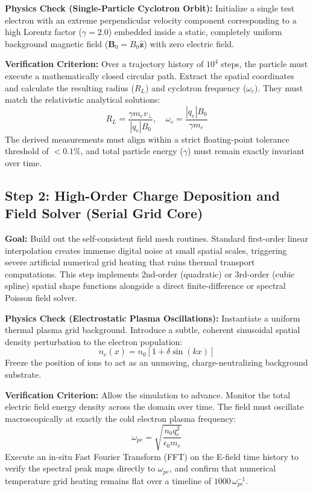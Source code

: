 \documentclass[11pt,a4paper]{article}
\begin{document}
\medskip
\noindent\textbf{Physics Check (Single-Particle Cyclotron Orbit):} Initialize a single test electron with an extreme perpendicular velocity component corresponding to a high Lorentz factor (\(\gamma = 2.0\)) embedded inside a static, completely uniform background magnetic field (\(\mathbf{B}_0 = B_0 \hat{\mathbf{z}}\)) with zero electric field.

\medskip
\noindent\textbf{Verification Criterion:} Over a trajectory history of \(10^4\) steps, the particle must execute a mathematically closed circular path. Extract the spatial coordinates and calculate the resulting radius (\(R_L\)) and cyclotron frequency (\(\omega_c\)). They must match the relativistic analytical solutions:
\begin{equation}
R_L = \frac{\gamma m_e v_\perp}{|q_e| B_0}, \quad \omega_c = \frac{|q_e| B_0}{\gamma m_e}
\end{equation}
The derived measurements must align within a strict floating-point tolerance threshold of \(<0.1\%\), and total particle energy (\(\gamma\)) must remain exactly invariant over time.

\subsection{Step 2: High-Order Charge Deposition and Field Solver (Serial Grid Core)}
\textbf{Goal:} Build out the self-consistent field mesh routines. Standard first-order linear interpolation creates immense digital noise at small spatial scales, triggering severe artificial numerical grid heating that ruins thermal transport computations. This step implements 2nd-order (quadratic) or 3rd-order (cubic spline) spatial shape functions alongside a direct finite-difference or spectral Poisson field solver.

\medskip
\noindent\textbf{Physics Check (Electrostatic Plasma Oscillations):} Instantiate a uniform thermal plasma grid background. Introduce a subtle, coherent sinusoidal spatial density perturbation to the electron population:
\begin{equation}
n_e(x) = n_0 \left[1 + \delta \sin(k x)\right]
\end{equation}
Freeze the position of ions to act as an unmoving, charge-neutralizing background substrate.

\medskip
\noindent\textbf{Verification Criterion:} Allow the simulation to advance. Monitor the total electric field energy density across the domain over time. The field must oscillate macroscopically at exactly the cold electron plasma frequency:
\begin{equation}
\omega_{pe} = \sqrt{\frac{n_0 q_e^2}{\epsilon_0 m_e}}
\end{equation}
Execute an in-situ Fast Fourier Transform (FFT) on the E-field time history to verify the spectral peak maps directly to \(\omega_{pe}\), and confirm that numerical temperature grid heating remains flat over a timeline of \(1000\,\omega_{pe}^{-1}\).
\end{document}
